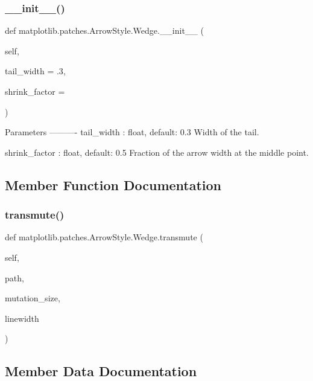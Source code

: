 \subsubsection{\texorpdfstring{\+\_\+\+\_\+init\+\_\+\+\_\+()}{\_\_init\_\_()}}
{\footnotesize\ttfamily def matplotlib.\+patches.\+Arrow\+Style.\+Wedge.\+\_\+\+\_\+init\+\_\+\+\_\+ (\begin{DoxyParamCaption}\item[{}]{self,  }\item[{}]{tail\+\_\+width = {\ttfamily .3},  }\item[{}]{shrink\+\_\+factor = {} }\end{DoxyParamCaption})}

\begin{DoxyVerb}Parameters
----------
tail_width : float, default: 0.3
    Width of the tail.

shrink_factor : float, default: 0.5
    Fraction of the arrow width at the middle point.
\end{DoxyVerb}
 

\subsection{Member Function Documentation}
\mbox{\label{classmatplotlib_1_1patches_1_1ArrowStyle_1_1Wedge_a87c1cadb1dd8128a1f16ba0c87cb4cc2}} 
\subsubsection{\texorpdfstring{transmute()}{transmute()}}
{\footnotesize\ttfamily def matplotlib.\+patches.\+Arrow\+Style.\+Wedge.\+transmute (\begin{DoxyParamCaption}\item[{}]{self,  }\item[{}]{path,  }\item[{}]{mutation\+\_\+size,  }\item[{}]{linewidth }\end{DoxyParamCaption})}



\subsection{Member Data Documentation}
\mbox{\label{classmatplotlib_1_1patches_1_1ArrowStyle_1_1Wedge_a186ec1fe4ade1753162d2f677fdc3761}} 
